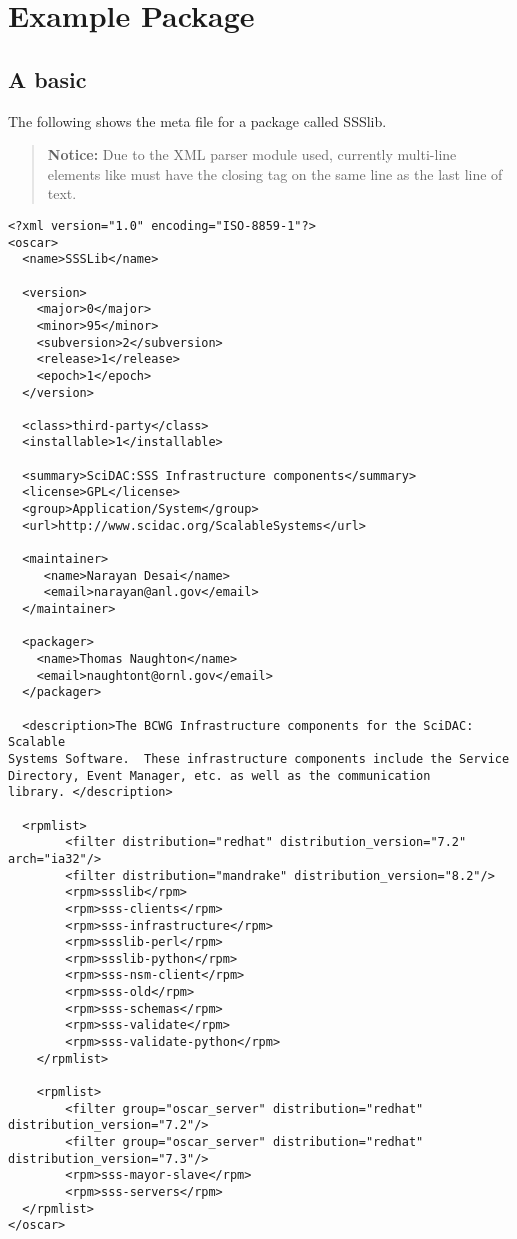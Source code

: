 
\section{Example Package}
\label{sect:example-pkg}

\subsection{A basic }
\label{sect:example-config-xml}

The following shows the meta file for a package called SSSlib.  

\begin{verse}
   {\bfseries Notice: } Due to the XML parser module used, currently
   multi-line elements like  must have the closing tag
   on the same line as the last line of text.  
\end{verse}


\begin{scriptsize}
\begin{verbatim}
<?xml version="1.0" encoding="ISO-8859-1"?>
<oscar>
  <name>SSSLib</name>

  <version>
    <major>0</major>
    <minor>95</minor>
    <subversion>2</subversion>
    <release>1</release>
    <epoch>1</epoch>
  </version>

  <class>third-party</class>
  <installable>1</installable>

  <summary>SciDAC:SSS Infrastructure components</summary>
  <license>GPL</license>
  <group>Application/System</group>
  <url>http://www.scidac.org/ScalableSystems</url>
  
  <maintainer>
     <name>Narayan Desai</name>
     <email>narayan@anl.gov</email>
  </maintainer>

  <packager>
    <name>Thomas Naughton</name>
    <email>naughtont@ornl.gov</email>
  </packager>

  <description>The BCWG Infrastructure components for the SciDAC: Scalable 
Systems Software.  These infrastructure components include the Service 
Directory, Event Manager, etc. as well as the communication 
library. </description>

  <rpmlist>
        <filter distribution="redhat" distribution_version="7.2" arch="ia32"/>
        <filter distribution="mandrake" distribution_version="8.2"/>
        <rpm>ssslib</rpm>
        <rpm>sss-clients</rpm>
        <rpm>sss-infrastructure</rpm>
        <rpm>ssslib-perl</rpm>
        <rpm>ssslib-python</rpm>
        <rpm>sss-nsm-client</rpm>
        <rpm>sss-old</rpm>
        <rpm>sss-schemas</rpm>
        <rpm>sss-validate</rpm>
        <rpm>sss-validate-python</rpm>
	</rpmlist>

	<rpmlist>
        <filter group="oscar_server" distribution="redhat" distribution_version="7.2"/>
        <filter group="oscar_server" distribution="redhat" distribution_version="7.3"/>
        <rpm>sss-mayor-slave</rpm>
        <rpm>sss-servers</rpm>
  </rpmlist>
</oscar>
\end{verbatim}
\end{scriptsize}


